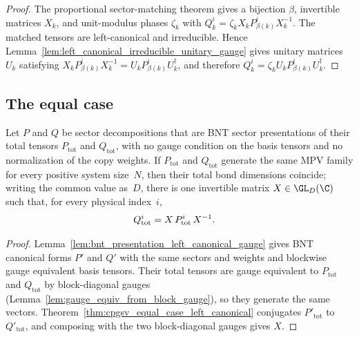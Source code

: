 \begin{proof}\leanok
    The proportional sector-matching theorem gives a bijection $\beta$,
    invertible matrices $X_k$, and unit-modulus phases $\zeta_k$ with
    $Q_k^i=\zeta_kX_kP_{\beta(k)}^iX_k^{-1}$. The matched tensors are
    left-canonical and irreducible. Hence
    Lemma~\ref{lem:left_canonical_irreducible_unitary_gauge} gives unitary
    matrices $U_k$ satisfying
    $X_kP_{\beta(k)}^iX_k^{-1}=U_kP_{\beta(k)}^iU_k^\dagger$, and therefore
    $Q_k^i=\zeta_kU_kP_{\beta(k)}^iU_k^\dagger$.
\end{proof}

\subsection{The equal case}
\label{subsec:ft_equal_case}

\begin{theorem}%
    \label{thm:cpgsv_equal_case_source}
    \leanok
    Let $P$ and $Q$ be sector decompositions that are BNT sector presentations
    of their total tensors $P_{\mathrm{tot}}$ and $Q_{\mathrm{tot}}$, with no
    gauge condition on the basis tensors and no normalization of the copy
    weights. If $P_{\mathrm{tot}}$ and $Q_{\mathrm{tot}}$ generate the same MPV
    family for every positive system size~$N$, then their total bond dimensions
    coincide; writing the common value as~$D$, there is one invertible matrix
    $X\in\GL_D(\C)$ such that, for every physical index~$i$,
    \begin{align}
        Q_{\mathrm{tot}}^i
         & =X\,P_{\mathrm{tot}}^i\,X^{-1}. \notag
    \end{align}
\end{theorem}

\begin{proof}\leanok
    Lemma~\ref{lem:bnt_presentation_left_canonical_gauge} gives BNT canonical
    forms $P'$ and $Q'$ with the same sectors and weights and blockwise gauge
    equivalent basis tensors. Their total tensors are gauge equivalent to
    $P_{\mathrm{tot}}$ and $Q_{\mathrm{tot}}$ by block-diagonal gauges
    (Lemma~\ref{lem:gauge_equiv_from_block_gauge}), so they generate the same
    vectors. Theorem~\ref{thm:cpgsv_equal_case_left_canonical} conjugates
    $P'_{\mathrm{tot}}$ to $Q'_{\mathrm{tot}}$, and composing with the two
    block-diagonal gauges gives $X$.
\end{proof}

